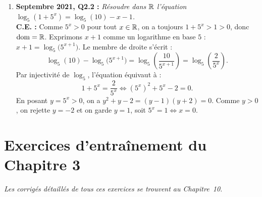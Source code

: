 \begin{exemple}
\begin{enumerate}
    \item \textbf{Septembre 2021, Q2.2 :} \emph{Résoudre dans $\mathbb{R}$ l'équation $\log_5(1 + 5^x) = \log_5(10) - x - 1$.}\\
    \textbf{C.E. :} Comme $5^x > 0$ pour tout $x \in \mathbb{R}$, on a toujours $1 + 5^x > 1 > 0$, donc $\operatorname{dom} = \mathbb{R}$.
    Exprimons $x + 1$ comme un logarithme en base $5$ : $x + 1 = \log_5\bigl(5^{x+1}\bigr)$. Le membre de droite s'écrit :
    \[
        \log_5(10) - \log_5\bigl(5^{x+1}\bigr) = \log_5\left(\frac{10}{5^{x+1}}\right) = \log_5\left(\frac{2}{5^x}\right).
    \]
    Par injectivité de $\log_5$, l'équation équivaut à :
    \[
        1 + 5^x = \frac{2}{5^x} \iff (5^x)^2 + 5^x - 2 = 0.
    \]
    En posant $y = 5^x > 0$, on a $y^2 + y - 2 = (y - 1)(y + 2) = 0$. Comme $y > 0$, on rejette $y = -2$ et on garde $y = 1$, soit $5^x = 1 \iff \boxed{x = 0}$.
\end{enumerate}
\end{exemple}

\section{Exercices d'entraînement du Chapitre 3}

\emph{Les corrigés détaillés de tous ces exercices se trouvent au Chapitre~10.}

